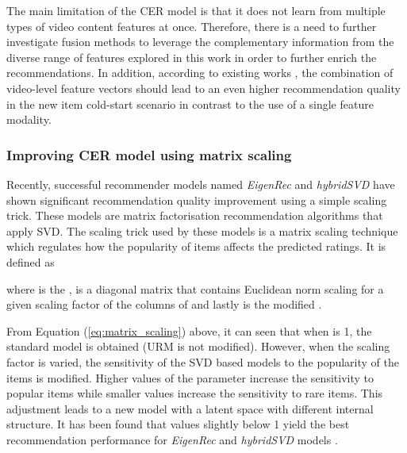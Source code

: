 \documentclass[review]{elsarticle}
\begin{document}
The main limitation of the \ac{CER} model is that it does not learn from multiple types of video content features at once. Therefore, there is a need to further investigate fusion methods to leverage the complementary information from the diverse range of features explored in this work in order to further enrich the recommendations. In addition, according to existing works \citep{lee2017large, ma2018lga}, the combination of video-level feature vectors should lead to an even higher recommendation quality in the new item cold-start scenario in contrast to the use of a single feature modality.



\subsubsection{Improving CER model using matrix scaling}\label{sec:scaledCER}

Recently, successful recommender models named \textit{EigenRec} \citep{nikolakopoulos2019eigenrec} and \sloppy \textit{hybridSVD} \citep{frolov2019hybridsvd} have shown significant recommendation quality improvement using a simple scaling trick. These models are matrix factorisation recommendation algorithms that apply \ac{SVD}. The scaling trick used by these models is a matrix scaling technique which regulates how the popularity of items affects the predicted ratings. It is defined as \citep{nikolakopoulos2019eigenrec}  



\noindent where  is the ,  is a diagonal matrix that contains Euclidean norm scaling for a given scaling factor  of the columns  of  and lastly  is the modified . 

From Equation (\ref{eq:matrix_scaling}) above, it can seen that when  is 1, the standard model is obtained (\ac{URM} is not modified). However, when the scaling factor is varied, the sensitivity of the SVD based models to the popularity of the items is modified. Higher values of the parameter  increase the sensitivity to popular items while smaller values increase the sensitivity to rare items. This adjustment leads to a new model with a latent space with different internal structure. It has been found that values slightly below 1 yield the best recommendation performance for \textit{EigenRec} and \textit{hybridSVD} models \citep{nikolakopoulos2019eigenrec,frolov2019hybridsvd}. 
\end{document}
